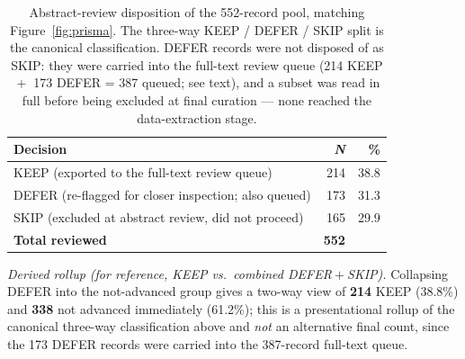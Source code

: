 \begin{table}[H]
\centering
\caption{Abstract-review disposition of the 552-record pool, matching
Figure~\ref{fig:prisma}. The three-way KEEP / DEFER / SKIP split is the
canonical classification. DEFER records were not disposed of as SKIP: they
were carried into the full-text review queue (214 KEEP ${}+{}$ 173 DEFER =
387 queued; see text), and a subset was read in full before being excluded
at final curation — none reached the data-extraction stage.}
\label{tab:abstract}
\begin{tabular}{lrr}
\toprule
\textbf{Decision} & \textbf{\textit{N}} & \textbf{\%} \\
\midrule
KEEP (exported to the full-text review queue)          & 214 & 38.8 \\
DEFER (re-flagged for closer inspection; also queued)  & 173 & 31.3 \\
SKIP (excluded at abstract review, did not proceed)    & 165 & 29.9 \\
\midrule
\textbf{Total reviewed}                                & \textbf{552} & \\
\bottomrule
\end{tabular}
\end{table}

\emph{Derived rollup (for reference, KEEP vs.\ combined DEFER${}+{}$SKIP).}
Collapsing DEFER into the not-advanced group gives a two-way view of
\textbf{214} KEEP (38.8\%) and \textbf{338} not advanced immediately
(61.2\%); this is a presentational rollup of the canonical three-way
classification above and \emph{not} an alternative final count, since the
173 DEFER records were carried into the 387-record full-text queue.

